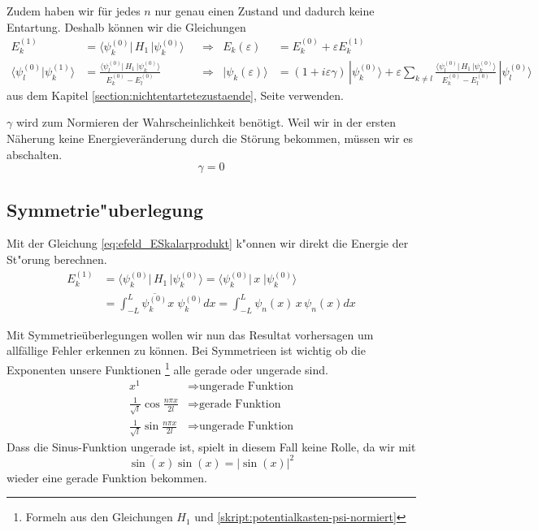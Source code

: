 \begin{refsection}
Zudem haben wir f\"ur jedes $n$ nur genau einen Zustand und dadurch keine Entartung. 
Deshalb k\"onnen wir die Gleichungen
\begin{equation}
\begin{aligned}
E_k^{(1)} &=
\langle \psi_k^{(0)}|\, H_1 \,|\psi_k^{(0)}\rangle
&&\Longrightarrow
& E_k(\varepsilon)&=E_k^{(0)} + \varepsilon E_k^{(1)}
\\
\langle\psi_l^{(0)}|\psi_k^{(1)}\rangle
&=
\frac{\langle \psi_l^{(0)}|\, H_1 \,|\psi_k^{(0)}\rangle}{E_k^{(0)}-E_l^{(0)}}
&&\Longrightarrow
& |\psi_k(\varepsilon)\rangle &=
(1+i\varepsilon \gamma)
\,|\psi_k^{(0)}\rangle
+
\varepsilon
\sum_{k\ne l}
\frac{\langle \psi_l^{(0)}|\, H_1 \,|\psi_k^{(0)}\rangle}{E_k^{(0)}-E_l^{(0)}}
\,
|\psi_l^{(0)}\rangle
\label{eq:efeld_ESkalarprodukt}
\end{aligned}
\end{equation}
aus dem Kapitel \ref{section:nichtentartetezustaende}, Seite \pageref{section:nichtentartetezustaende} verwenden.

$\gamma$ wird zum Normieren der Wahrscheinlichkeit ben\"otigt. Weil wir in der ersten N\"aherung keine 
Energiever\"anderung durch die St\"orung bekommen, m\"ussen wir es abschalten.
\[
  \gamma = 0
\]





\subsection{Symmetrie"uberlegung}
Mit der Gleichung \ref{eq:efeld_ESkalarprodukt} k"onnen wir direkt die Energie der St"orung berechnen.
\begin{equation}
\begin{aligned}
  E_{k}^{(1)} 
 &= \langle \psi_k^{(0)}|\, H_1 \,|\psi_k^{(0)}\rangle 
  = \langle \psi_k^{(0)}|\, x \;|\psi_k^{(0)}\rangle                   \\
 &= \int_{-L}^{L} \overline{\psi_k^{(0)}} x \; \psi_k^{(0)} dx
  = \int_{-L}^{L} \psi_n(x) \, x \, \psi_n(x) dx
\end{aligned}
\end{equation}

Mit Symmetrie\"uberlegungen wollen wir nun das Resultat vorhersagen um allf\"allige Fehler erkennen zu k\"onnen.
Bei Symmetrieen ist wichtig ob die Exponenten unsere Funktionen
\footnote{Formeln aus den Gleichungen $H_1$ und \ref{skript:potentialkasten-psi-normiert}}
alle gerade oder ungerade sind.
\begin{equation}
\begin{aligned}
x^1 &\Rightarrow \text{ungerade Funktion}
\\
\frac{1}{\sqrt{l}}\cos\frac{n \pi x}{2l} &\Rightarrow \text{gerade Funktion}
\\
\frac{1}{\sqrt{l}}\sin\frac{n \pi x}{2l} &\Rightarrow \text{ungerade Funktion}
\end{aligned}
\end{equation}
Dass die Sinus-Funktion ungerade ist, spielt in diesem Fall keine Rolle, da wir mit 
\[
  \overline{\sin(x)} \sin(x) = |\sin(x)|^2
\]
wieder eine gerade Funktion bekommen.


\end{refsection}

